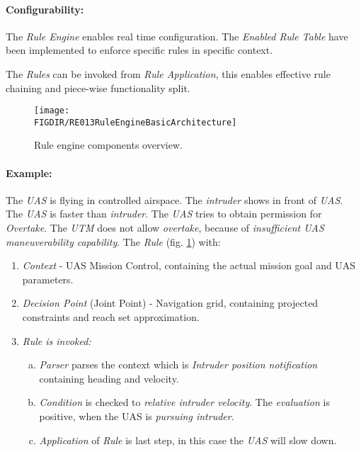 \paragraph{Configurability:} The \emph{Rule Engine} enables real time configuration. The \emph{Enabled Rule Table} have been implemented to enforce specific rules in specific context. 

The \emph{Rules} can be invoked from \emph{Rule Application}, this enables effective rule chaining and piece-wise functionality split. 

\begin{figure}[H]
    \centering
    \texttt{[image: \\FIGDIR/RE013RuleEngineBasicArchitecture]}
    \caption{Rule engine components overview.}
    \label{fig:RuleEngineBasicArchitecture}
\end{figure}

\paragraph{Example:} The \emph{UAS} is flying in controlled airspace. The \emph{intruder} shows in front of \emph{UAS}. The \emph{UAS} is faster than \emph{intruder}. The \emph{UAS} tries to obtain permission for \emph{Overtake}. The \emph{UTM} does not allow \emph{overtake}, because of \emph{insufficient UAS maneuverability capability}. The \emph{Rule} (fig. \ref{fig:RuleEngineBasicArchitecture}) with:
\begin{enumerate}
    \item \emph{Context} - UAS Mission Control, containing the actual mission goal and UAS parameters. 
    
    \item \emph{Decision Point} (Joint Point) - Navigation grid, containing projected constraints and reach set approximation.
    
    \item \emph{Rule is invoked:}
    \begin{enumerate}[a.]
        \item \emph{Parser} parses the context which is \emph{Intruder position notification} containing heading and velocity.
        
        \item \emph{Condition} is checked to \emph{relative intruder velocity}. The \emph{evaluation} is positive, when the UAS is \emph{pursuing intruder}.
        
        \item \emph{Application} of \emph{Rule} is last step, in this case the \emph{UAS} will slow down.
    \end{enumerate}
\end{enumerate}